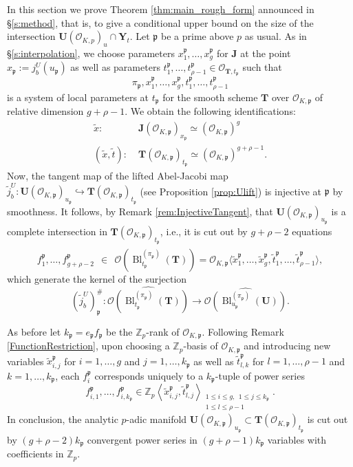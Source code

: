 \documentclass[11pt,oneside]{amsart}
\theoremstyle{plain}
\theoremstyle{definition}
\def\lra{{\longrightarrow}}
\DeclareMathOperator{\Bl}{Bl}
\def\fp{\mathfrak{p}}
\def\TT{\mathbf{T}}
\def\Z{\mathbb{Z}}
\def\J{\mathbf{J}}
\def\U{\mathbf{U}}
\def\Y{\mathbf{Y}}
\def\oh{\mathcal{O}}
\begin{document}
In this section we prove Theorem \ref{thm:main_rough_form} announced in \S \ref{s:method}, that is, to give a conditional upper bound on the size of the intersection $\U(\oh_{K, p})_u\cap \Y_t$.
Let $\mathfrak{p}$ be a prime above $p$ as usual. As in \S \ref{s:interpolation}, we choose parameters $x_1^{\fp}, \ldots, x_g^{\fp}$ for $\J$ at the point $x_\fp:=j_b^U(u_\fp)$ as well as parameters $t_1^{\fp}, \ldots, t_{\rho-1}^{\fp}\in \oh_{\TT, t_{\fp}}$ such that 
$$\pi_{\fp}, x_1^{\fp}, \ldots, x_g^{\fp}, t_1^{\fp}, \ldots, t_{\rho-1}^{\fp}$$ is a system of local parameters at $t_\fp$ for the smooth scheme $\TT$ over $\oh_{K, \fp}$ of relative dimension $g+\rho-1$. 
We obtain the following identifications:
\begin{align*}
\tilde{x} :  \;& \J(\oh_{K, \fp})_{x_\fp} \simeq (\oh_{K, \fp})
^g \\ 
(\tilde{x}, \tilde{t}) : \; &\TT(\oh_{K, \fp})_{t_\fp} \simeq (\oh_{K, \fp})
^{g+\rho-1}. 
\end{align*}
Now, the tangent map of the lifted Abel-Jacobi map $\tilde{j}_b^U : \U(\oh_{K,\fp})_{u_\fp}\hookrightarrow \TT(\oh_{K, \fp})_{t_\fp}$ (see Proposition \ref{prop:Ulift}) is injective at $\fp$ by smoothness. It follows, by Remark \ref{rem:InjectiveTangent}, that $\U(\oh_{K, \fp})_{u_\fp}$ is a complete intersection in $\TT(\oh_{K,\mathfrak{p}})_{t_{\mathfrak{p}}}$, i.e., it is cut out by $g+\rho-2$ equations
\[
f_1^{\fp}, \ldots, f_{g+\rho-2}^{\fp} \:\: \in \:\: \widehat{\oh(\Bl_{t_\fp}^{(\pi_{\fp})}(\TT))}=\oh_{K,\fp}\langle \tilde{x}_1^{\fp}, \ldots, \tilde{x}_g^{\fp}, \tilde{t}_1^{\fp}, \ldots, \tilde{t}_{\rho-1}^{\fp} \rangle,
\]
which generate the kernel of the surjection 
$$(\tilde{j}^U_b)^{\#}_{\fp} : \widehat{\oh(\Bl_{t_\fp}^{(\pi_{\fp})}(\TT))}\lra \widehat{\oh(\Bl_{u_\fp}^{(\pi_{\fp})}(\U))}.$$

As before let $k_{\fp}=e_{\fp}f_{\fp}$ be the $\Z_p$-rank of $\oh_{K, \fp}$. Following Remark \ref{FunctionRestriction}, upon choosing a $\Z_p$-basis of $\oh_{K, \fp}$ and introducing new variables $\tilde{x}_{i, j}^{\fp}$ for $i=1, \ldots, g$ and $j=1, \ldots, k_{\fp}$ as well as $\tilde{t}_{l,k}^{\fp}$ for $l=1, \ldots, \rho-1$ and $k=1, \ldots, k_{\fp}$, each $f_i^{\fp}$ corresponds uniquely to a $k_{\fp}$-tuple of power series 
\[
f_{i,1}^{\fp}, \ldots, f_{i, k_\fp}^{\fp} \in \Z_p\left\langle \tilde{x}_{i, j}^{\fp}, \tilde{t}_{l, j}^{\fp}
\right\rangle_{\substack{ 1\leq i\leq g, \:\:
    1\leq j\leq k_{\fp} \\
    1\leq l\leq \rho-1 \: \qquad  }}. 
\]
In conclusion, the analytic $p$-adic manifold $\U(\oh_{K,\fp})_{u_{\fp}}\subset \TT(\oh_{K,\fp})_{t_{\fp}}$ is cut out by $(g+\rho-2)k_\fp$ convergent power series in $(g+\rho-1)k_\fp$ variables with coefficients in $\Z_p$.
\end{document}
